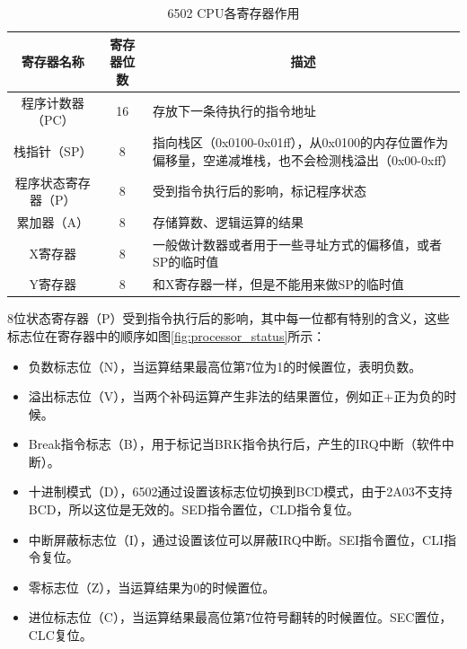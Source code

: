 \documentclass[a4paper]{ltxdoc}
\begin{document}
{\begin{table}[h]
\centering
\caption{6502 CPU各寄存器作用}
\label{tab:registers}
\begin{tabularx}{\textwidth}{|c|c|X|}
\hline
\rowcolor[HTML]{8DCDFF}
寄存器名称     & 寄存器位数 & \multicolumn{1}{c|}{\cellcolor[HTML]{8DCDFF}描述}                 \\ \hline
程序计数器（PC） & 16    & 存放下一条待执行的指令地址                                                   \\ \hline
栈指针（SP）   & 8     & 指向栈区（0x0100-0x01ff），从0x0100的内存位置作为偏移量，空递减堆栈，也不会检测栈溢出（0x00-0xff） \\ \hline
程序状态寄存器（P）  & 8     & 受到指令执行后的影响，标记程序状态                                               \\ \hline
累加器（A）    & 8     & 存储算数、逻辑运算的结果                                                    \\ \hline
X寄存器      & 8     & 一般做计数器或者用于一些寻址方式的偏移值，或者SP的临时值                                   \\ \hline
Y寄存器      & 8     & 和X寄存器一样，但是不能用来做SP的临时值                                           \\ \hline
\end{tabularx}
\end{table}

8位状态寄存器（P）受到指令执行后的影响，其中每一位都有特别的含义，这些标志位在寄存器中的顺序如图\ref{fig:processor_status}所示：
\begin{itemize}
\item 负数标志位（N），当运算结果最高位第7位为1的时候置位，表明负数。
\item 溢出标志位（V），当两个补码运算产生非法的结果置位，例如正+正为负的时候。
\item Break指令标志（B），用于标记当BRK指令执行后，产生的IRQ中断（软件中断）。
\item 十进制模式（D），6502通过设置该标志位切换到BCD模式，由于2A03不支持BCD，所以这位是无效的。SED指令置位，CLD指令复位。
\item 中断屏蔽标志位（I），通过设置该位可以屏蔽IRQ中断。SEI指令置位，CLI指令复位。
\item 零标志位（Z），当运算结果为0的时候置位。
\item 进位标志位（C），当运算结果最高位第7位符号翻转的时候置位。SEC置位，CLC复位。
\end{itemize}

}
\end{document}
